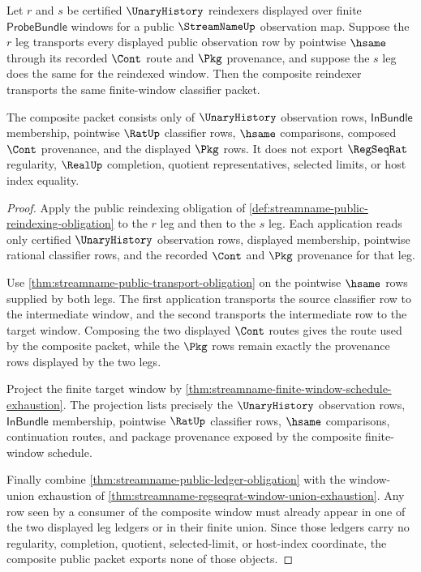 \begin{theorem}
\label{thm:streamname-public-reindexing-composition}
Let $r$ and $s$ be certified $\UnaryHistory$ reindexers displayed over finite
$\mathsf{ProbeBundle}$ windows for a public $\StreamNameUp$ observation map.
Suppose the $r$ leg transports every displayed public observation row by
pointwise $\hsame$ through its recorded $\Cont$ route and $\Pkg$ provenance,
and suppose the $s$ leg does the same for the reindexed window. Then the
composite reindexer transports the same finite-window classifier packet.

The composite packet consists only of $\UnaryHistory$ observation rows,
$\mathsf{InBundle}$ membership, pointwise $\RatUp$ classifier rows, $\hsame$
comparisons, composed $\Cont$ provenance, and the displayed $\Pkg$ rows. It
does not export $\RegSeqRat$ regularity, $\RealUp$ completion, quotient
representatives, selected limits, or host index equality.
\end{theorem}
\begin{proof}
Apply the public reindexing obligation of
\autoref{def:streamname-public-reindexing-obligation} to the $r$ leg and then
to the $s$ leg. Each application reads only certified $\UnaryHistory$
observation rows, displayed membership, pointwise rational classifier rows,
and the recorded $\Cont$ and $\Pkg$ provenance for that leg.

Use \autoref{thm:streamname-public-transport-obligation} on the pointwise
$\hsame$ rows supplied by both legs. The first application transports the
source classifier row to the intermediate window, and the second transports
the intermediate row to the target window. Composing the two displayed
$\Cont$ routes gives the route used by the composite packet, while the
$\Pkg$ rows remain exactly the provenance rows displayed by the two legs.

Project the finite target window by
\autoref{thm:streamname-finite-window-schedule-exhaustion}. The projection
lists precisely the $\UnaryHistory$ observation rows, $\mathsf{InBundle}$
membership, pointwise $\RatUp$ classifier rows, $\hsame$ comparisons,
continuation routes, and package provenance exposed by the composite
finite-window schedule.

Finally combine \autoref{thm:streamname-public-ledger-obligation} with the
window-union exhaustion of
\autoref{thm:streamname-regseqrat-window-union-exhaustion}. Any row seen by a
consumer of the composite window must already appear in one of the two
displayed leg ledgers or in their finite union. Since those ledgers carry no
regularity, completion, quotient, selected-limit, or host-index coordinate,
the composite public packet exports none of those objects.
\end{proof}

